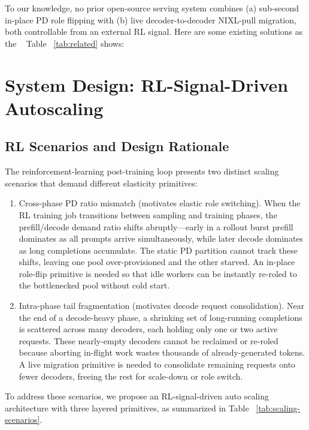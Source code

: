 \documentclass[10pt,twocolumn,letterpaper]{article}
\begin{document}
To our knowledge, no prior open-source serving system combines (a) sub-second in-place PD role flipping with (b) live decoder-to-decoder NIXL-pull migration, both controllable from an external RL signal. Here are some existing solutions as the ~ Table ~\ref{tab:related} shows:

\section{System Design: RL-Signal-Driven Autoscaling}
\label{sec:system-design}

\subsection{RL Scenarios and Design Rationale}
\label{sec:rl-scenarios}

The reinforcement-learning post-training loop presents two distinct scaling scenarios that demand different elasticity primitives:

\begin{enumerate}[nosep]
\item Cross-phase PD ratio mismatch (motivates elastic role switching). When the RL training job transitions between sampling and training phases, the prefill/decode demand ratio shifts abruptly---early in a rollout burst prefill dominates as all prompts arrive simultaneously, while later decode dominates as long completions accumulate. The static PD partition cannot track these shifts, leaving one pool over-provisioned and the other starved. An in-place role-flip primitive is needed so that idle workers can be instantly re-roled to the bottlenecked pool without cold start.
\item Intra-phase tail fragmentation (motivates decode request consolidation). Near the end of a decode-heavy phase, a shrinking set of long-running completions is scattered across many decoders, each holding only one or two active requests. These nearly-empty decoders cannot be reclaimed or re-roled because aborting in-flight work wastes thousands of already-generated tokens. A live migration primitive is needed to consolidate remaining requests onto fewer decoders, freeing the rest for scale-down or role switch.
\end{enumerate}

To address these scenarios, we propose an RL-signal-driven auto scaling architecture with three layered primitives, as summarized in    Table ~\ref{tab:scaling-scenarios}.
\end{document}
